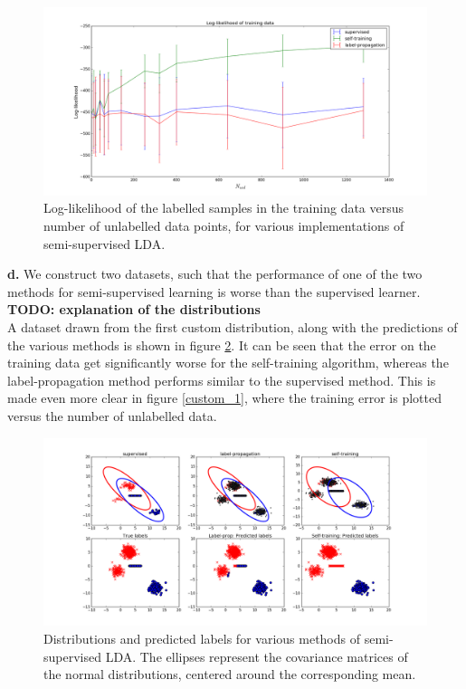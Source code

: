 \documentclass [a4paper] {report}
\begin{document}
	\begin{figure}[H]
		\begin{center}
			\includegraphics[scale=0.3]{Images/spambase_likelihood.png}
			\caption{Log-likelihood of the labelled samples in the training data versus number of unlabelled data points, for various implementations of semi-supervised LDA.}
			\label{spambase_likelihood}
		\end{center}
	\end{figure}
	
	\textbf{d.}
	We construct two datasets, such that the performance of one of the two methods for semi-supervised learning is worse than the supervised learner.\\
	\textbf{TODO: explanation of the distributions}\\
	A dataset drawn from the first custom distribution, along with the predictions of the various methods is shown in figure \ref{custom_1_dist}. It can be seen that the error on the training data get significantly worse for the self-training algorithm, whereas the label-propagation method performs similar to the supervised method. This is made even more clear in figure \ref{custom_1}, where the training error is plotted versus the number of unlabelled data.
	
	\begin{figure}[H]
		\begin{center}
			\includegraphics[scale=0.3]{Images/custom1.png}
			\caption{Distributions and predicted labels for various methods of semi-supervised LDA. The ellipses represent the covariance matrices of the normal distributions, centered around the corresponding mean.}
			\label{custom_1_dist}
		\end{center}
	\end{figure}	
	
\end{document}
